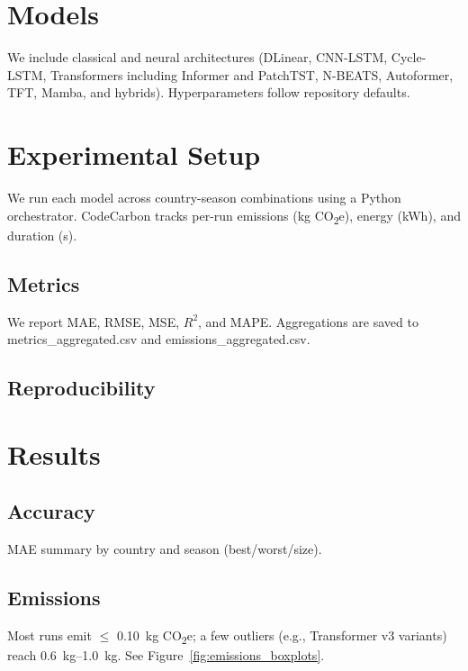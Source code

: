 \documentclass[10pt,conference]{IEEEtran}
\begin{document}
\section{Models}
We include classical and neural architectures (DLinear, CNN-LSTM, Cycle-LSTM, Transformers including Informer and PatchTST, N-BEATS, Autoformer, TFT, Mamba, and hybrids). Hyperparameters follow repository defaults.

\section{Experimental Setup}
We run each model across country-season combinations using a Python orchestrator. CodeCarbon tracks per-run emissions (kg CO\textsubscript{2}e), energy (kWh), and duration (s).

\subsection{Metrics}
We report MAE, RMSE, MSE, $R^2$, and MAPE. Aggregations are saved to metrics\_aggregated.csv and emissions\_aggregated.csv.

\subsection{Reproducibility}

\section{Results}
\subsection{Accuracy}
\begin{table}[t]
  \centering
  \caption{MAE summary by country and season (best/worst/size).}
  \label{tab:mae_summary}
  
\end{table}

\subsection{Emissions}
Most runs emit $\leq$ \SI{0.10}{kg} CO\textsubscript{2}e; a few outliers (e.g., Transformer v3 variants) reach \SIrange{0.6}{1.0}{kg}. See Figure~\ref{fig:emissions_boxplots}.
\end{document}
